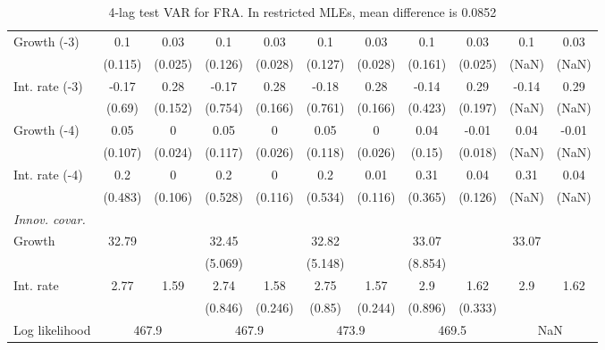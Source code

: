 \begin{table}[htbp]
\begin{tabular}{@{\extracolsep{4pt}}lcccccccccc@{}}
\quad Growth (-3) 	 &0.1 	 & 0.03 	 & 0.1 	 & 0.03 	 & 0.1 	 & 0.03 	 & 0.1 	 & 0.03 	 & 0.1 	 & 0.03	 \\ 
 		 & (0.115) 	 & (0.025) 	 & (0.126) 	 & (0.028) 	 & (0.127) 	 & (0.028) 	 & (0.161) 	 & (0.025) 	 & (NaN) 	 & (NaN) 	 \\ 
\quad Int. rate (-3) 	 &-0.17 	 & 0.28 	 & -0.17 	 & 0.28 	 & -0.18 	 & 0.28 	 & -0.14 	 & 0.29 	 & -0.14 	 & 0.29	 \\ 
 		 & (0.69) 	 & (0.152) 	 & (0.754) 	 & (0.166) 	 & (0.761) 	 & (0.166) 	 & (0.423) 	 & (0.197) 	 & (NaN) 	 & (NaN) 	 \\ 
\quad Growth (-4) 	 &0.05 	 & 0 	 & 0.05 	 & 0 	 & 0.05 	 & 0 	 & 0.04 	 & -0.01 	 & 0.04 	 & -0.01	 \\ 
 		 & (0.107) 	 & (0.024) 	 & (0.117) 	 & (0.026) 	 & (0.118) 	 & (0.026) 	 & (0.15) 	 & (0.018) 	 & (NaN) 	 & (NaN) 	 \\ 
\quad Int. rate (-4) 	 &0.2 	 & 0 	 & 0.2 	 & 0 	 & 0.2 	 & 0.01 	 & 0.31 	 & 0.04 	 & 0.31 	 & 0.04	 \\ 
 		 & (0.483) 	 & (0.106) 	 & (0.528) 	 & (0.116) 	 & (0.534) 	 & (0.116) 	 & (0.365) 	 & (0.126) 	 & (NaN) 	 & (NaN) 	 \\ 
\rule{0pt}{4ex} \emph{Innov. covar.}  	 & 	 & 	 & 	 & 	 & 	 & 	 & 	 & 	 & 	 &\\ 
\quad Growth 	 &32.79 	 &  	 & 32.45 	 &  	 & 32.82 	 &  	 & 33.07 	 &  	 & 33.07 	 & 	 \\ 
 		 &  	 &  	 & (5.069) 	 &  	 & (5.148) 	 &  	 & (8.854) 	 &  	 &  	 &  	 \\ 
\quad Int. rate 	 &2.77 	 & 1.59 	 & 2.74 	 & 1.58 	 & 2.75 	 & 1.57 	 & 2.9 	 & 1.62 	 & 2.9 	 & 1.62	 \\ 
 		 &  	 &  	 & (0.846) 	 & (0.246) 	 & (0.85) 	 & (0.244) 	 & (0.896) 	 & (0.333) 	 &  	 &  	 \\ 
 \hline \rule{0pt}{4ex} 
  Log likelihood 	 &\multicolumn{2}{c}{467.9} 	 & \multicolumn{2}{c}{467.9} 	 & \multicolumn{2}{c}{473.9} 	 & \multicolumn{2}{c}{469.5} 	 & \multicolumn{2}{c}{NaN}\\ 

 \hline 	\end{tabular}		\caption{4-lag test VAR for FRA. In restricted MLEs, mean difference is 0.0852}
		\label{tab:FRA4lag}

\end{table}